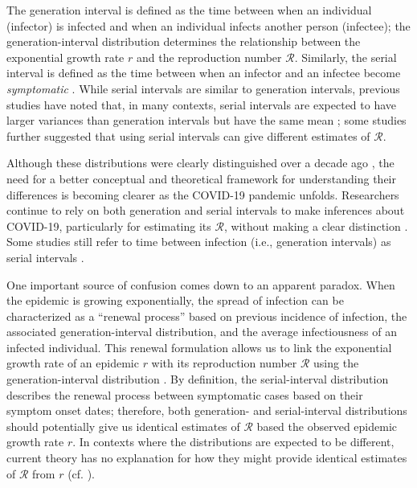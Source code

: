 \documentclass[12pt]{article}
\newcommand{\RR}{\ensuremath{{\mathcal R}}\xspace}
\begin{document}
The generation interval is defined as the time between when an individual (infector) is infected and when an individual infects another person (infectee);
the generation-interval distribution determines the relationship between the exponential growth rate $r$ and the reproduction number \RR \citep{wallinga2007generation}.
Similarly, the serial interval is defined as the time between when an infector and an infectee become \emph{symptomatic} \citep{svensson2007note}.
While serial intervals are similar to generation intervals, previous studies have noted that, in many contexts, serial intervals are expected to have larger variances than generation intervals but have the same mean \citep{svensson2007note,klinkenberg2011correlation,te2013estimating,champredon2018equivalence};
some studies further suggested that using serial intervals can give different estimates of \RR \citep{britton2019estimation}.

Although these distributions were clearly distinguished over a decade ago \citep{svensson2007note}, 
the need for a better conceptual and theoretical framework for understanding their differences is becoming clearer as the COVID-19 pandemic unfolds.
Researchers continue to rely on both generation and serial intervals to make inferences about COVID-19, particularly for estimating its \RR, without making a clear distinction \citep{tempvar,du2020serial,he2020temporal,wu2020nowcasting,zhao2020serial}.
Some studies still refer to time between infection (i.e., generation intervals) as serial intervals \citep{anderson2020will,hellewell2020feasibility}.

One important source of confusion comes down to an apparent paradox.
When the epidemic is growing exponentially, the spread of infection can be characterized as a ``renewal process'' based on previous incidence of infection, the associated generation-interval distribution, and the average infectiousness of an infected individual.
This renewal formulation allows us to link the exponential growth rate of an epidemic $r$ with its reproduction number \RR using the generation-interval distribution \citep{wallinga2007generation}.
By definition, the serial-interval distribution describes the renewal process between symptomatic cases based on their symptom onset dates;
therefore, both generation- and serial-interval distributions should potentially give us identical estimates of  \RR based the observed epidemic growth rate $r$.
In contexts where the distributions are expected to be different, current theory has no explanation for how they might provide identical estimates of \RR from $r$ (cf. \cite{britton2019estimation}).
\end{document}

